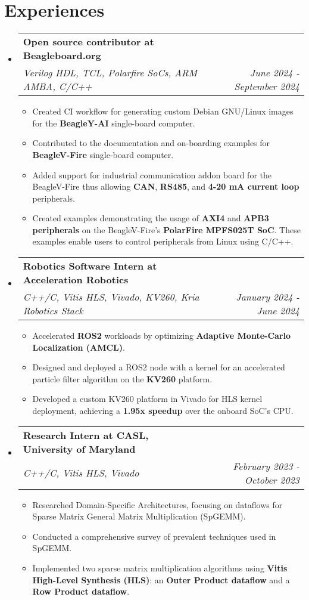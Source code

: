 \documentclass[letterpaper,11pt]{article}
\makeatletter
\newcommand{\resumeItem}[1]{
  \item\small{
    {#1 \vspace{-2pt}}
  }
}
\newcommand{\resumeSubheading}[4]{
  \vspace{-2pt}\item
    \begin{tabular*}{1.0\textwidth}[t]{l@{\extracolsep{\fill}}r}
      \textbf{#1} & \textbf{\small #2} \\
      \textit{\small#3} & \textit{\small #4} \\
    \end{tabular*}\vspace{-7pt}
}
\newcommand{\resumeSubHeadingListStart}{\begin{itemize}[leftmargin=0.0in, label={}]}
\newcommand{\resumeSubHeadingListEnd}{\end{itemize}}
\newcommand{\resumeItemListStart}{\begin{itemize}}
\newcommand{\resumeItemListEnd}{\end{itemize}\vspace{-5pt}}
\makeatother
\begin{document}
\section{Experiences}
  \resumeSubHeadingListStart
    \resumeSubheading
        {Open source contributor at Beagleboard.org \href{https://openbeagle.org/superchamp234}{\faExternalLink}}{}{Verilog HDL, TCL, Polarfire SoCs, ARM AMBA, C/C++}{June 2024 - September 2024}
        \resumeItemListStart
            \resumeItem{Created CI workflow for generating custom Debian GNU/Linux images for the \textbf{BeagleY-AI} single-board computer.}
            \resumeItem{Contributed to the documentation and on-boarding examples for \textbf{BeagleV-Fire} single-board computer.}
            \resumeItem{Added support for industrial communication addon board for the BeagleV-Fire thus allowing \textbf{CAN}, \textbf{RS485}, and \textbf{4-20 mA current loop} peripherals.}
            \resumeItem{Created examples demonstrating the usage of \textbf{AXI4} and \textbf{APB3 peripherals} on the BeagleV-Fire's \textbf{PolarFire MPFS025T SoC}. These examples enable users to control peripherals from Linux using C/C++.}
        \resumeItemListEnd
    \resumeSubheading
        {Robotics Software Intern at Acceleration Robotics \href{https://drive.google.com/file/d/1zK9jAKZ9oBVwV1-_GcFWSXyqZOX0cpnZ/view?usp=sharing}{\faExternalLink}}{}{C++/C, Vitis HLS, Vivado, KV260, Kria Robotics Stack}{January 2024 - June 2024}
        \resumeItemListStart
            \resumeItem{Accelerated \textbf{ROS2} workloads by optimizing \textbf{Adaptive Monte-Carlo Localization (AMCL)}.}
            \resumeItem{Designed and deployed a ROS2 node with a kernel for an accelerated particle filter algorithm on the \textbf{KV260} platform.}
            \resumeItem{Developed a custom KV260 platform in Vivado for HLS kernel deployment, achieving a \textbf{1.95x speedup} over the onboard SoC's CPU.}
        \resumeItemListEnd
    \resumeSubheading
      {Research Intern at CASL, University of Maryland  \href{{https://drive.google.com/drive/folders/19r-r_VaqXl1FvfySPe8bHm7v4QKsKUU0?usp=sharing}}{\faExternalLink}}{}
      {C++/C, Vitis HLS, Vivado}{February 2023 - October 2023}
      \resumeItemListStart
        \resumeItem{Researched Domain-Specific Architectures, focusing on dataflows for Sparse Matrix General Matrix Multiplication (SpGEMM).}
        \resumeItem{Conducted a comprehensive survey of prevalent techniques used in SpGEMM.}
        \resumeItem{Implemented two sparse matrix multiplication algorithms using \textbf{Vitis High-Level Synthesis (HLS)}: an \textbf{Outer Product dataflow} and a \textbf{Row Product dataflow}.}   
    \resumeItemListEnd
  \resumeSubHeadingListEnd
\end{document}
